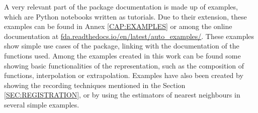 A very relevant part of the package documentation is made up of examples,
which are Python notebooks written as tutorials. Due to their extension, these
examples can be found in Annex \ref{CAP:EXAMPLES} or among the online documentation
at \href{https://fda.readthedocs.io/en/latest/auto_examples/}{fda.readthedocs.io/en/latest/auto\_examples/}.
These examples show simple use cases of the package, linking with the documentation of the functions used. Among the examples created in this work can be found some showing basic functionalities of the representation, such as the composition of functions, interpolation or extrapolation. Examples have also been created by showing the recording techniques mentioned in the Section \ref{SEC:REGISTRATION}, or by using the estimators of nearest neighbours in several simple examples.
